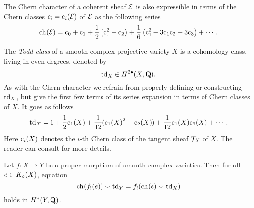 The Chern character of a coherent sheaf $\mathcal E$ is also expressible in terms of the Chern classes $\cclass[i] = \cclass[i](\E)$ of $\mathcal E$ as the following series
\[
    \ch[]{\E} = \cclass[0] + \cclass[1] + \frac{1}{2}\left(\cclass[1]^2 - \cclass[2]\right) + \frac{1}{6}\left(\cclass[1]^3 - 3 \cclass[1]\cclass[2] + 3\cclass[3]\right) + \cdots.
\]



The \emph{Todd class} of a smooth complex projective variety $X$ is a cohomology class, living in even degrees, denoted by
\[
    \operatorname{td}_{X} \in H^{2\bullet}(X, \mathbf Q).
\]
As with the Chern character we refrain from properly defining or constructing $\operatorname{td}_{X}$, but give the first few terms of its series expansion in terms of Chern classes of $X$. It goes as follows
\[
    \tdclass{X} = 1 + \frac{1}{2}\cclass[1](X) + \frac{1}{12}(\cclass[1]{X}^2 + \cclass[2]{X}) + \frac{1}{12}\cclass[1](X)\cclass[2](X) + \cdots.
\] 
Here $\cclass[i](X)$ denotes the $i$-th Chern class of the tangent sheaf $\mathcal{T}_{X}$ of $X$. The reader can consult \cite[\S 3.2]{Fulton1998} for more details.





\begin{theorem}
    \label{Grothendieck-Riemann-Roch}
    Let $f \colon X \to Y$ be a proper morphism of smooth complex varieties. Then for all $e \in K_{\circ}(X)$, equation 
    \begin{equation}
        \label{eq: GRR}
        \ch[]{f_!(e)} \smallsmile \tdclass{Y} = f_!(\ch[]{e} \smallsmile \tdclass{X})
    \end{equation}
    holds in $H^{*}(Y, \mathbf Q)$.
\end{theorem}

